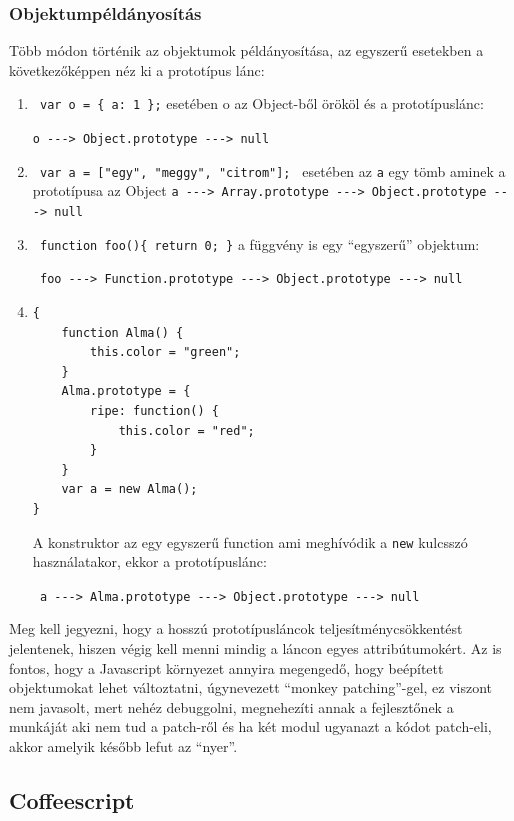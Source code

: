 \subsubsection{Objektumpéldányosítás}

Több módon történik az objektumok példányosítása, az egyszerű esetekben a következőképpen néz ki a prototípus lánc: 
\begin{enumerate}
\item \lstinline| var o = { a: 1 };| esetében o az Object-ből örököl és a prototípuslánc:

 \lstinline|o ---> Object.prototype ---> null|
\item \lstinline| var a = ["egy", "meggy", "citrom"]; | esetében az \lstinline{a} egy tömb aminek a prototípusa az Object \lstinline|a ---> Array.prototype ---> Object.prototype ---> null|
\item \lstinline| function foo(){ return 0; }| a függvény is egy ``egyszerű'' objektum: 

\lstinline| foo ---> Function.prototype ---> Object.prototype ---> null| 

\item 
\begin{lstlisting}
{
    function Alma() {
        this.color = "green";
    }
    Alma.prototype = {
        ripe: function() {
            this.color = "red";
        } 
    }
    var a = new Alma();
}
\end{lstlisting}

A konstruktor az egy egyszerű function ami meghívódik a \lstinline{new} kulcsszó használatakor, ekkor a prototípuslánc: 

\lstinline| a ---> Alma.prototype ---> Object.prototype ---> null|

\end{enumerate}

Meg kell jegyezni, hogy a hosszú prototípusláncok teljesítménycsökkentést jelentenek, hiszen végig kell menni mindig a láncon egyes attribútumokért. Az is fontos, hogy a Javascript környezet annyira megengedő, hogy beépített objektumokat lehet változtatni, úgynevezett ``monkey patching''-gel, ez viszont nem javasolt, mert nehéz debuggolni, megnehezíti annak a fejlesztőnek a munkáját aki nem tud a patch-ről és ha két modul ugyanazt a kódot patch-eli, akkor amelyik később lefut az ``nyer''.



\subsection{Coffeescript}

